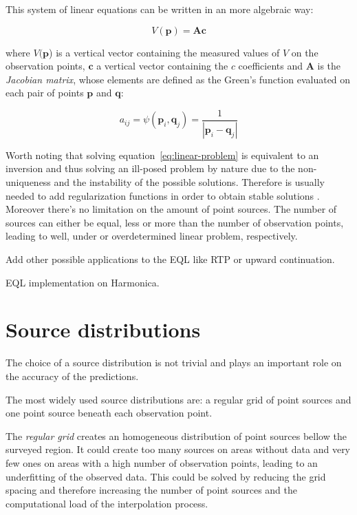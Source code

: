 \documentclass[twocolumn]{article}
\begin{document}
This system of linear equations can be written in an more algebraic way:

\begin{equation}
    V(\mathbf{p}) = \mathbf{A} \mathbf{c}
    \label{eq:linear-problem}
\end{equation}

\noindent where $V(\mathbf{p}$) is a vertical vector containing the measured
values of $V$ on the observation points, $\mathbf{c}$ a vertical vector
containing the $c$ coefficients and $\mathbf{A}$ is the \emph{Jacobian matrix},
whose elements are defined as the Green's function evaluated on each pair of
points $\mathbf{p}$ and $\mathbf{q}$:

\begin{equation}
    a_{ij}
    =
    \psi(\mathbf{p}_i, \mathbf{q}_j)
    =
    \frac{1}{|\mathbf{p}_i - \mathbf{q}_j|}
\end{equation}


Worth noting that solving equation~\ref{eq:linear-problem} is equivalent to
an inversion and thus solving an ill-posed problem by nature due to the
non-uniqueness and the instability of the possible solutions.
Therefore is usually needed to add regularization functions in order to obtain
stable solutions \citep{oliveira2013}.
Moreover there's no limitation on the amount of point sources.
The number of sources can either be equal, less or more than the number of
observation points, leading to well, under or overdetermined linear problem,
respectively.

Add other possible applications to the EQL like RTP or upward continuation.

EQL implementation on Harmonica.


\section{Source distributions}


The choice of a source distribution is not trivial and plays an important role
on the accuracy of the predictions.

The most widely used source distributions are: a regular grid of point sources
and one point source beneath each observation point.

The \emph{regular grid} creates an homogeneous distribution of point sources
bellow the surveyed region.
It could create too many sources on areas without data and very few ones on
areas with a high number of observation points, leading to an underfitting of
the observed data.
This could be solved by reducing the grid spacing and therefore increasing the
number of point sources and the computational load of the interpolation
process.
\end{document}
